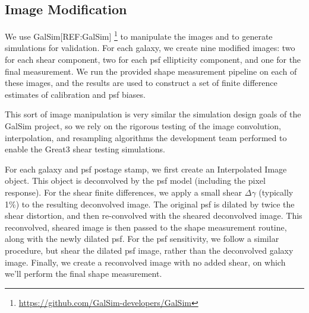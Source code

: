 \documentclass[iop]{emulateapj}
\begin{document}
\subsection{Image Modification}
We use GalSim[REF:GalSim] \footnote{\url{https://github.com/GalSim-developers/GalSim}} to manipulate the images and to generate simulations for validation. For each galaxy, we create nine modified images: two for each shear component, two for each psf ellipticity component, and one for the final measurement. We run the provided shape measurement pipeline on each of these images, and the results are used to construct a set of finite difference estimates of calibration and psf biases.

This sort of image manipulation is very similar the simulation design goals of the GalSim  project, so we rely on the rigorous testing of the image convolution, interpolation, and resampling algorithms the development team performed to enable the Great3 shear testing simulations.

For each galaxy and psf postage stamp, we first create an Interpolated Image object. This object is deconvolved by the psf model (including the pixel response). For the shear finite differences, we apply a small shear $\Delta\gamma$ (typically 1\%) to the resulting deconvolved image. The original psf is dilated by twice the shear distortion, and then re-convolved with the sheared deconvolved image. This reconvolved, sheared image is then passed to the shape measurement routine, along with the newly dilated psf. For the psf sensitivity, we follow a similar procedure, but shear the dilated psf image, rather than the deconvolved galaxy image. Finally, we create a reconvolved image with no added shear, on which we'll perform the final shape measurement. 
\end{document}
